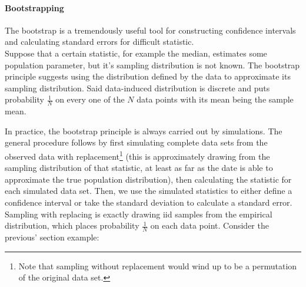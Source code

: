 \documentclass{homework}
\begin{document}
\paragraph{\textbf{Bootstrapping}}

The bootstrap is a tremendously useful tool for constructing confidence intervals and calculating standard errors for difficult statistic. \\

Suppose that a certain statistic, for example the median, estimates some population parameter, but it's sampling distribution is not known. The bootstrap principle suggests using the distribution defined by the data to approximate its sampling distribution. Said data-induced distribution is discrete and puts probability $\frac{1}{N}$ on every one of the $N$ data points with its mean being the sample mean. 

In practice, the bootstrap principle is always carried out by simulations. The general procedure follows by first simulating complete data sets from the observed data with replacement\footnote{Note that sampling without replacement would wind up to be a permutation of the original data set.} (this is approximately drawing from the sampling distribution of that statistic, at least as far as the date is able to approximate the true population distribution), then calculating the statistic
for each simulated data set. Then, we use the simulated statistics to either define a confidence interval or take the standard deviation to calculate a standard error. \\

Sampling with replacing is exactly drawing iid samples
from the empirical distribution, which places probability $\frac{1}{N}$ on each data point. Consider the previous' section example:
\end{document}
